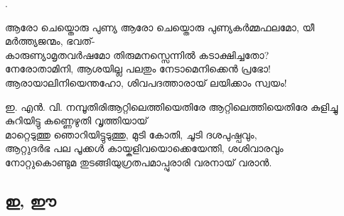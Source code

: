 \begin{enumerate}

.

\begin{slokam}{\VSv}{\Unk}{ആരോ ചെയ്തൊരു പുണ്യ}
ആരോ ചെയ്തൊരു പുണ്യകർമ്മഫലമോ, യീ മർത്ത്യജന്മം, ഭവത്- \\
കാരുണ്യാമൃതവർഷമോ തിരുമനസ്സെന്നിൽ കടാക്ഷിച്ചതോ? \\
നേരോതാമിനി, ആശയില്ല പലതും നേടാമെനിക്കെൻ പ്രഭോ!\\
ആരായാലിനിയെന്തഹോ, ശിവപദത്താരായ് ലയിക്കാം സ്വയം!
\end{slokam} 
 

\begin{slokam}{\VKm}{ഇ. എൻ. വി. നമ്പൂതിരി}{ആറ്റിലെത്തിയെതിരേ}
ആറ്റിലെത്തിയെതിരേ കുളിച്ചു കുറിയിട്ടു കണ്ണെഴുതി വൃത്തിയായ്\\
മാറ്റെടുത്തു ഞൊറിയിട്ടുടുത്തു, മുടി കോതി, ചൂടി ദശപുഷ്പവും,\\
ആറ്റുദർഭ പല പൂക്കൾ കായ്കളിവയൊക്കെയേന്തി, ശശിവാരവും \\
നോറ്റുകൊണ്ടുമ തുടങ്ങിയുഗ്രതപമാപ്പുരാരി വരനായ് വരാൻ.
\end{slokam}


\end{enumerate}

\subsection{ഇ, ഈ}

